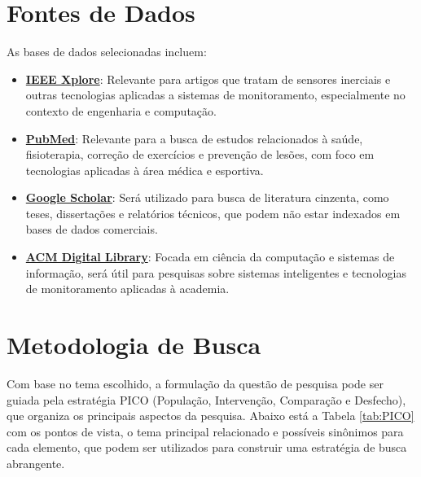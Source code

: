 \documentclass[a4paper,12pt]{article}
\begin{document}
\section{Fontes de Dados}
\label{sec:fontes}
As bases de dados selecionadas incluem:
\begin{itemize}
    \item \textbf{\href{https://ieeexplore.ieee.org/search/advanced}{IEEE Xplore}}: Relevante para artigos que tratam de sensores inerciais e outras tecnologias aplicadas a sistemas de monitoramento, especialmente no contexto de engenharia e computação.
    \item \textbf{\href{https://pubmed.ncbi.nlm.nih.gov/advanced/}{PubMed}}: Relevante para a busca de estudos relacionados à saúde, fisioterapia, correção de exercícios e prevenção de lesões, com foco em tecnologias aplicadas à área médica e esportiva.
    \item \textbf{\href{https://scholar.google.com/}{Google Scholar}}: Será utilizado para busca de literatura cinzenta, como teses, dissertações e relatórios técnicos, que podem não estar indexados em bases de dados comerciais.
    \item \textbf{\href{https://dl.acm.org/search/advanced}{ACM Digital Library}}: Focada em ciência da computação e sistemas de informação, será útil para pesquisas sobre sistemas inteligentes e tecnologias de monitoramento aplicadas à academia.
\end{itemize}

\section{Metodologia de Busca}
Com base no tema escolhido, a formulação da questão de pesquisa pode ser guiada pela estratégia PICO (População, Intervenção, Comparação e Desfecho), que organiza os principais aspectos da pesquisa. Abaixo está a Tabela \ref{tab:PICO} com os pontos de vista, o tema principal relacionado e possíveis sinônimos para cada elemento, que podem ser utilizados para construir uma estratégia de busca abrangente.
\end{document}
